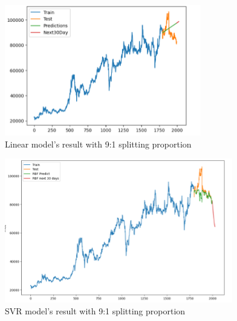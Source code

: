 \documentclass{ieeeojies}
\begin{document}
\begin{figure}[H]
  \centering
  \begin{minipage}{0.8\linewidth}
    \centering
    \includegraphics[width=\linewidth]{bibliography/LN_VCB91.png}
    \caption{Linear model's result with 9:1 splitting proportion}
    \label{fig8}
  \end{minipage}
\end{figure}
\begin{figure}[H]
  \centering
  \begin{minipage}{0.8\linewidth}
    \centering
    \includegraphics[width=\linewidth]{bibliography/SVR_VCB91.png}
    \caption{SVR model's result with 9:1 splitting proportion}
    \label{fig9}
  \end{minipage}
\end{figure}
\end{document}
